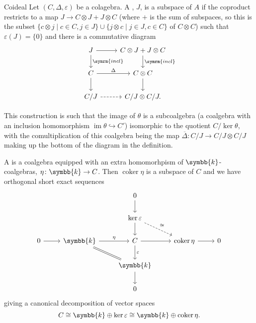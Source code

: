 \documentclass[fleqn]{NotesClass}
\newcommand{\isomorphic}{\cong}
\renewcommand{\field}{\symbb{k}}
\newcommand{\incl}{\symrm{incl}}
\DeclareMathOperator{\im}{im}
\DeclareMathOperator{\coker}{coker}
\begin{document}
    \begin{dfn}{Coideal}{}
        Let \((C, \Delta, \varepsilon)\) be a colagebra.
        A , \(J\), is a subspace of \(A\) if the coproduct restricts to a map \(J \to C \otimes J + J \otimes C\) (where \(+\) is the sum of subspaces, so this is the subset \(\{c \otimes j \mid c \in C, j \in J\} \cup \{j \otimes c \mid j \in J, c \in C\}\) of \(C \otimes C\)) such that \(\varepsilon(J) = \{0\}\) and there is a commutative diagram
        \begin{equation}
            \begin{tikzcd}
                J \arrow[d, "\incl"] \arrow[r] & C \otimes J + J \otimes C \arrow[d, "\incl"]\\
                C \arrow[r, "\Delta"] \arrow[d] & C \otimes C \arrow[d]\\
                C/J \arrow[r, dashed] & C/J \otimes C/J.
            \end{tikzcd}
        \end{equation}
    \end{dfn}
    
    This construction is such that the image of \(\theta\) is a subcoalgebra (a coalgebra with an inclusion homomorphism \(\im \theta \hookrightarrow C'\)) isomorphic to the quotient \(C/\ker \theta\), with the comultiplication of this coalgebra being the map \(\overbar{\Delta} \colon C/J \to C/J \otimes C/J\) making up the bottom of the diagram in the definition.
    
    A  is a coalgebra equipped with an extra homomorhpism of \(\field\)-coalgebras, \(\eta \colon \field \to C\).
    Then \(\coker \eta\) is a subspace of \(C\) and we have orthogonal short exact sequences
    \begin{equation}
        \begin{tikzcd}
            & & 0\arrow[d]\\
            & & \ker \varepsilon \arrow[d] \arrow[dr, dashed, "\isomorphic"]\\
            0 \arrow[r] & \field \arrow[r, "\eta"] \arrow[dr, equal] & C \arrow[r] \arrow[d, "\varepsilon"] & \coker \eta \arrow[r] & 0\\
            & & \field \arrow[d] \\
            & & 0
        \end{tikzcd}
    \end{equation}
    giving a canonical decomposition of vector spaces
    \begin{equation}
        C \isomorphic \field \oplus \ker \varepsilon \isomorphic \field \oplus \coker \eta.
    \end{equation}
    
\end{document}
